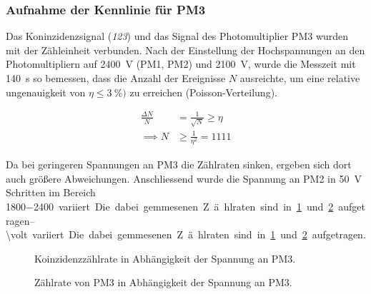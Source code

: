 \documentclass[slug=LM, room=Andreas-Schubert-Bau\,\ K\ 1A, supervisor=Anne-Sophie\ Berthold, coursedate=13.\ 12.\ 2019]{../../Lab_Report_LaTeX/lab_report}
\begin{document}
\subsubsection{Aufnahme der Kennlinie f\"ur PM3}
\label{sec:pm3kenn}

Das Koninzidenzsignal (\textit{123}) und das Signal des
Photomultiplier PM3 wurden mit der Z\"ahleinheit verbunden.  Nach der
Einstellung der Hochspannungen an den Photomultipliern auf
\SI{2400}{\volt} (PM1, PM2) und \SI{2100}{\volt}, wurde die Messzeit
mit \SI{140}{\second} so bemessen, dass die Anzahl der Ereignisse
\(N\) ausreichte, um eine relative ungenauigkeit von
\(\eta \leq \SI{3}{\percent})\) zu erreichen (Poisson-Verteilung).

\begin{align}
  \label{eq:mtime}
  \frac{\Delta N}{N} &= \frac{1}{\sqrt{N}} \geq \eta \\
  \implies N &\geq \frac{1}{\eta^2} = 1111
\end{align}

Da bei geringeren Spannungen an PM3 die Z\"ahlraten sinken, ergeben
sich dort auch gr\"o\ss{}ere Abweichungen.  Anschliessend wurde die
Spannung an PM2 in \SI{50}{\volt} Schritten im Bereich
\SIrange{1800-2400}{\volt} variiert.
Die dabei gemmesenen Z\"ahlraten
sind in~\ref{fig:vorversuch-kennlinie_123} und
\ref{fig:vorversuch-kennlinie_pm3} aufgetragen.

\begin{figure}[h]\centering
  
  \caption{Koinzidenzz\"ahlrate in Abh\"angigkeit der Spannung an PM3.}
  \label{fig:vorversuch-kennlinie_123}
\end{figure}

\begin{figure}[h]\centering
  
  \caption{Z\"ahlrate von PM3 in Abh\"angigkeit der Spannung an PM3.}
  \label{fig:vorversuch-kennlinie_pm3}
\end{figure}
\end{document}
